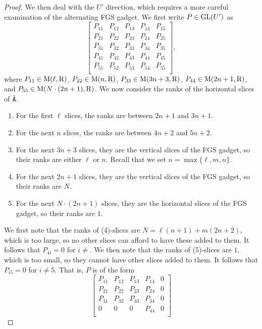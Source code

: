\begin{proof}
We then deal with the $U'$ direction, which requires a more careful examination of the alternating FGS gadget. We first write $P\in \GL(U')$ as 
\begin{equation}\label{eq:P55}
\begin{bmatrix}
	P_{11} & P_{12} & P_{13} & P_{14} & P_{15}\\
	P_{21} & P_{22} & P_{23} & P_{24} & P_{25}\\
	P_{31} & P_{32} & P_{33} & P_{34} & P_{35}\\
	P_{41} & P_{42} & P_{43} & P_{44} & P_{45}\\
	P_{51} & P_{52} & P_{53} & P_{54} & P_{55}\\
\end{bmatrix},
\end{equation}
where $P_{11}\in\M(\ell, \rng)$, $P_{22}\in\M(n, \rng)$, $P_{33}\in\M(3n+3, \rng)$, $P_{44}\in\M(2n+1, \rng)$, and $P_{55}\in\M(N\cdot (2n+1), \rng)$. We now consider the ranks of the horizontal slices of $\bar\tA$. 
\begin{enumerate}
	\item For the first $\ell$ slices, the ranks are between $2n+1$ and $3n+1$.
	\item For the next $n$ slices, the ranks are between $4n+2$ and $5n+2$. 
	\item For the next $3n+3$ slices, they are the vertical slices of the FGS gadget, so their ranks are either $\ell$ or $n$. Recall that we set $n=\max\{\ell, m, n\}$.
	\item For the next $2n+1$ slices, they are the vertical slices of the FGS gadget, so their ranks are $N$. 
	\item For the next $N\cdot (2n+1)$ slices, they are the horizontal slices of the FGS gadget, so their ranks are $1$. 
\end{enumerate}
We first note that the ranks of (4)-slices are $N=\ell(n+1)+m(2n+2)$, which is too large, so no other slices can afford to have these added to them. It follows that $P_{4i}=0$ for $i\neq $. We then note that the ranks of (5)-slices are $1$, which is too small, so they cannot have other slices added to them. It follows that $P_{i5}=0$ for $i\neq 5$. That is, $P$ is of the form 
$$\begin{bmatrix}
	P_{11} & P_{12} & P_{13} & P_{14} & 0\\
	P_{21} & P_{22} & P_{23} & P_{24} & 0\\
	P_{31} & P_{32} & P_{33} & P_{34} & 0\\
	0 & 0 & 0 & P_{44} & 0\\

\end{bmatrix}$$
\end{proof}
